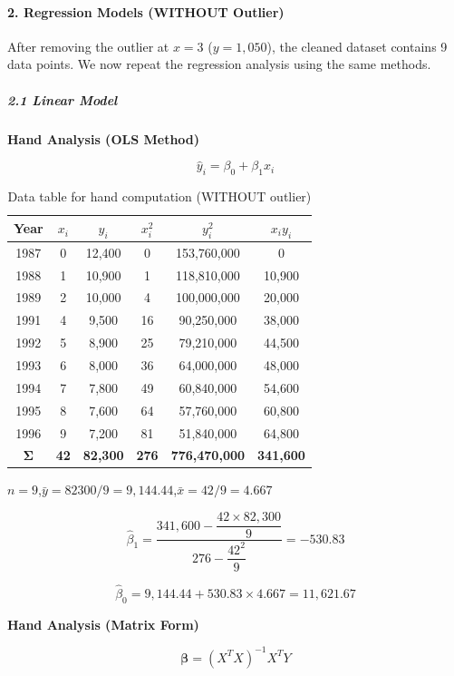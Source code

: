 \documentclass[12pt,a4paper]{article}
\begin{document}
\paragraph{2. Regression Models (WITHOUT Outlier)}

After removing the outlier at $x=3$ ($y=1{,}050$), the cleaned dataset contains 9
data points. We now repeat the regression analysis using the same methods.

\subparagraph{2.1 Linear Model}

\textbf{Hand Analysis (OLS Method)}

\[
\hat{y}_i = \beta_0 + \beta_1 x_i
\]

\begin{table}[H]
\centering
\caption{Data table for hand computation (WITHOUT outlier)}
\begin{tabular}{cccccc}
\toprule
\textbf{Year} & $x_i$ & $y_i$ & $x_i^2$ & $y_i^2$ & $x_i y_i$ \\
\midrule
1987 & 0  & 12,400 & 0   & 153,760,000 & 0       \\
1988 & 1  & 10,900 & 1   & 118,810,000 & 10,900  \\
1989 & 2  & 10,000 & 4   & 100,000,000 & 20,000  \\
1991 & 4  & 9,500  & 16  & 90,250,000  & 38,000  \\
1992 & 5  & 8,900  & 25  & 79,210,000  & 44,500  \\
1993 & 6  & 8,000  & 36  & 64,000,000  & 48,000  \\
1994 & 7  & 7,800  & 49  & 60,840,000  & 54,600  \\
1995 & 8  & 7,600  & 64  & 57,760,000  & 60,800  \\
1996 & 9  & 7,200  & 81  & 51,840,000  & 64,800  \\
\midrule
$\boldsymbol{\Sigma}$ & \textbf{42} & \textbf{82,300} & \textbf{276} & \textbf{776,470,000} & \textbf{341,600} \\
\bottomrule
\end{tabular}
\end{table}

$n = 9$,\quad $\bar{y} = 82300/9 = 9{,}144.44$,\quad $\bar{x} = 42/9 = 4.667$

\[
\hat{\beta}_1 = \frac{341{,}600 - \dfrac{42 \times 82{,}300}{9}}{276 - \dfrac{42^2}{9}} = -530.83
\]

\[
\hat{\beta}_0 = 9{,}144.44 + 530.83 \times 4.667 = 11{,}621.67
\]

\textbf{Hand Analysis (Matrix Form)}

\[
\bm{\beta} = (X^T X)^{-1} X^T Y
\]
\end{document}
